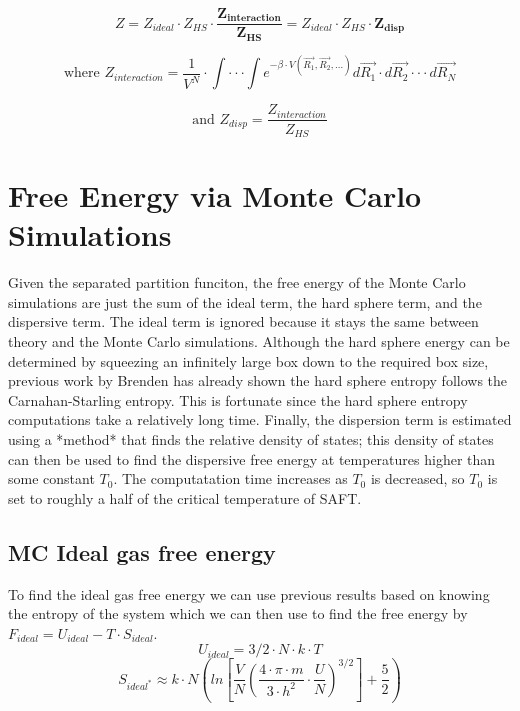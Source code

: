 \begin{equation}\label{eq:disp1}
Z=Z_{ideal}\cdot Z_{HS}\cdot \boldsymbol{\frac{Z_{interaction}}{Z_{HS}}}=Z_{ideal}\cdot Z_{HS}\cdot \boldsymbol{Z_{disp}}
\end{equation}

\begin{equation}\label{eq:disp1}
\text{where }Z_{interaction}=\frac{1}{V^N}\cdot \int\cdot\cdot\cdot\int e^{-\beta\cdot V(\vec{R_1},\vec{R_2},...)}d\vec{R_1}\cdot d\vec{R_2}\cdot\cdot\cdot d\vec{R_N}
\end{equation}

\begin{equation}\label{eq:disp1}
\text{and }Z_{disp}= \frac{Z_{interaction}}{Z_{HS}}
\end{equation}
\section{Free Energy via Monte Carlo Simulations}
Given the separated partition funciton, the free energy of the Monte Carlo simulations are just the sum of the ideal term, the hard sphere term, and the dispersive term. The ideal term is ignored because it stays the same between theory and the Monte Carlo simulations. Although the hard sphere energy can be determined by squeezing an infinitely large box down to the required box size, previous work by Brenden has already shown the hard sphere entropy follows the Carnahan-Starling entropy. This is fortunate since the hard sphere entropy computations take a relatively long time. Finally, the dispersion term is estimated using a *method* that finds the relative density of states; this density of states can then be used to find the dispersive free energy at temperatures higher than some constant $T_0$. The computatation time increases as $T_0$ is decreased, so $T_0$ is set to roughly a half of the critical temperature of SAFT.
\subsection{MC Ideal gas free energy}
To find the ideal gas free energy we can use previous results based on knowing the entropy of the system which we can then use to find the free energy by $F_{ideal}=U_{ideal}-T\cdot S_{ideal}$.
\begin{equation}\label{eq:idealInternalEnergy}
U_{ideal}=3/2\cdot N\cdot k\cdot T
\end{equation}
\begin{equation}\label{eq:sackurTetrodeApprox}
S_{ideal^*}\approx k\cdot N \left ( ln\left [ \frac{V}{N}\left ( \frac{4\cdot \pi\cdot m}{3\cdot h^2}\cdot \frac{U}{N} \right)^{3/2} \right]+\frac{5}{2}\right )
\end{equation}


